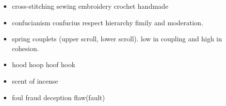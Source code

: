 \documentclass[a4paper,11pt,twoside]{book}
\begin{document}
\begin{itemize}
	\item cross-stitching sewing embroidery crochet handmade
	
	
	\item confucianism confucius respect hierarchy fimily  and moderation.
	
	\item spring couplets (upper scroll, lower scroll). low in coupling and high in cohesion.
	
	\item hood hoop hoof hook
	
	
	\item scent of incense
	
	
	\item foul fraud deception flaw(fault)
	
	
\end{itemize}
\end{document}

